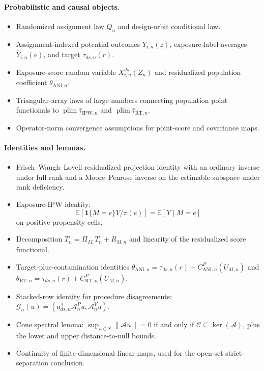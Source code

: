\documentclass[11pt]{article}
\newcommand{\E}{\mathbb{E}}
\newcommand{\one}{\mathbf{1}}
\newcommand{\transpose}{\mathsf{T}}
\newcommand{\plim}{\operatorname*{plim}}
\theoremstyle{definition}
\theoremstyle{plain}
\theoremstyle{remark}
\begin{document}
\paragraph{Probabilistic and causal objects.}
\begin{itemize}[leftmargin=*]
\item Randomized assignment law \(Q_n\) and design-orbit conditional law.
\item Assignment-indexed potential outcomes \(Y_{i,n}(z)\), exposure-label
averages \(\bar Y_{i,n}(e)\), and target
\(\tau_{ds,n}(r)\).
\item Exposure-score random variable \(X_{i,n}^{ds}(Z_n)\) and residualized
population coefficient \(\theta_{\mathrm{ANI},n}\).
\item Triangular-array laws of large numbers connecting population point
functionals to \(\plim\hat\tau_{\mathrm{IPW},n}\) and
\(\plim\hat\tau_{\mathrm{RT},n}\).
\item Operator-norm convergence assumptions for point-score and covariance
maps.
\end{itemize}

\paragraph{Identities and lemmas.}
\begin{itemize}[leftmargin=*]
\item Frisch--Waugh--Lovell residualized projection identity with an ordinary
inverse under full rank and a Moore--Penrose inverse on the estimable subspace
under rank deficiency.
\item Exposure-IPW identity:
\[
  \E[\one\{M=e\}Y/\pi(e)]=\E[Y\mid M=e]
\]
on positive-propensity cells.
\item Decomposition \(T_n=\Pi_{M_r}T_n+R_{M,n}\) and linearity of the
residualized score functional.
\item Target-plus-contamination identities
\(\theta_{\mathrm{ANI},n}=\tau_{ds,n}(r)+C^P_{\mathrm{ANI},n}(U_{M,n})\) and
\(\theta_{\mathrm{RT},n}=\tau_{ds,n}(r)+C^P_{\mathrm{RT},n}(U_{M,n})\).
\item Stacked-row identity for procedure disagreements:
\(\mathcal G_n(u)=(a_{ds,n}^{\transpose}\mathcal A^P_nu,\mathcal A^V_nu)\).
\item Cone spectral lemma:
\(\sup_{u\in S}\|\mathcal A u\|=0\) if and only if
\(\mathcal C\subseteq\ker(\mathcal A)\), plus the lower and upper
distance-to-null bounds.
\item Continuity of finite-dimensional linear maps, used for the open-set
strict-separation conclusion.
\end{itemize}
\end{document}
